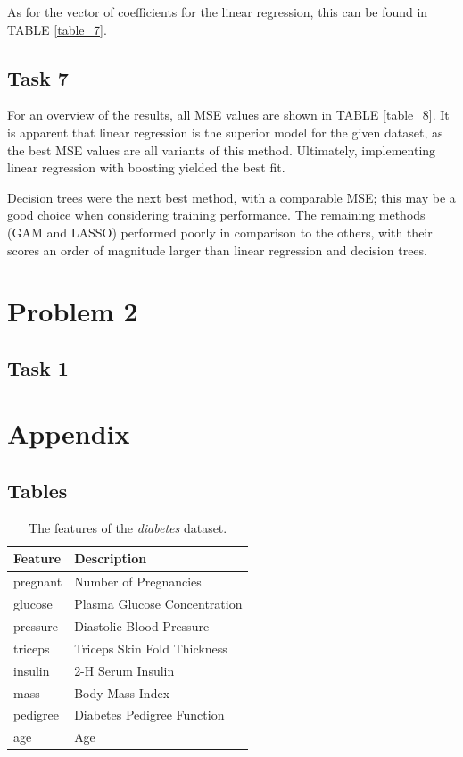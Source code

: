 \documentclass[twoside,twocolumn,10pt]{revtex4-1}
\begin{document}
	As for the vector of coefficients for the linear regression, this can be found in TABLE \ref{table_7}.
	 
	\subsection*{Task 7}
	
	For an overview of the results, all MSE values are shown in TABLE \ref{table_8}.  It is apparent that linear regression is the superior model for the given dataset, as the best MSE values are all variants of this method.  Ultimately, implementing linear regression with boosting yielded the best fit.  
	
	Decision trees were the next best method, with a comparable MSE; this may be a good choice when considering training performance.  The remaining methods (GAM and LASSO) performed poorly in comparison to the others, with their scores an order of magnitude larger than linear regression and decision trees.

	\section{Problem 2}
	
	\subsection*{Task 1}
	
	
	
	\newpage
	
	\section{Appendix}
	
	
	\subsection{Tables}
	
	\begin{table}[H]
	\center
		\begin{tabular}{l l}
		\textbf{Feature} & \textbf{Description} \\ 
		\hline
		pregnant & Number of Pregnancies\\
		glucose & Plasma Glucose Concentration\\
		pressure & Diastolic Blood Pressure\\
		triceps & Triceps Skin Fold Thickness\\
		insulin & 2-H Serum Insulin\\
		mass & Body Mass Index\\
		pedigree & Diabetes Pedigree Function\\
		age & Age
		\end{tabular}
		\caption{The features of the \textit{diabetes} dataset.\label{table_1}}
	\end{table}
	
\end{document}

